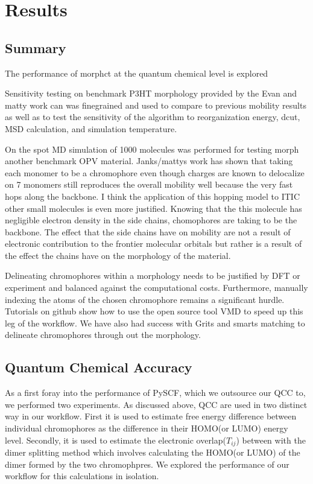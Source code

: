 \chapter{Results}
\label{chap:results}

\section{Summary}

The performance of morphct at the quantum chemical level is explored

Sensitivity testing on benchmark P3HT morphology provided by the Evan and matty work can was finegrained and
used to compare to previous mobility results as well as to test the sensitivity of the algorithm to
reorganization energy, dcut, MSD calculation, and simulation temperature.

On the spot MD simulation of 1000
molecules was performed for testing morph another benchmark OPV material. Janks/mattys work has shown that taking
each monomer to be a chromophore even though charges are known to delocalize on 7 monomers still reproduces
the overall mobility well because the very fast hops along the backbone. I think the application of this
hopping model to ITIC other small molecules is even more justified. Knowing that the this molecule has
negligible electron density in the side chains, chomophores are taking to be the backbone. The effect that
the side chains have on mobility are not a result of electronic contribution to the frontier molecular
orbitals but rather is a result of the effect the chains have on the morphology of the material. 

Delineating chromophores within a morphology needs to be justified by DFT or experiment and balanced against
the computational costs. Furthermore, manually indexing the atoms of the chosen chromophore
remains a significant hurdle. Tutorials on github show how to use the open source tool VMD to speed up this
leg of the workflow. We have also had success with Grits and smarts matching to delineate chromophores through
out the morphology. 

\section{Quantum Chemical Accuracy}

As a first foray into the performance of PySCF, which we outsource our QCC to, we performed two experiments.
As discussed above, QCC are used in two distinct way in our workflow. First it is used to estimate free energy
difference between individual chromophores as the difference in their HOMO(or LUMO) energy level. Secondly, it is
used to estimate the electronic overlap($T_{ij}$) between with the dimer splitting method which involves
calculating the HOMO(or LUMO) of the dimer formed by the two chromophpres. We explored the performance of our
workflow for this calculations in isolation. 

